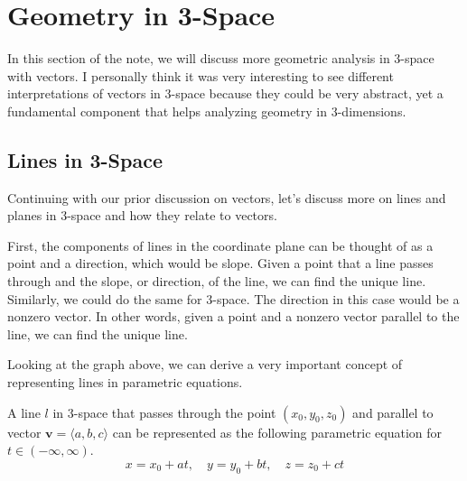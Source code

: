 \documentclass[../../main.tex]{subfiles}
\begin{document}
\section{Geometry in 3-Space}

In this section of the note, we will discuss more geometric
analysis in 3-space with vectors. I personally think it was
very interesting to see different interpretations of vectors
in 3-space because they could be very abstract, yet a fundamental
component that helps analyzing geometry in 3-dimensions.

\subsection{Lines in 3-Space}

Continuing with our prior discussion on vectors, let's discuss
more on lines and planes in 3-space and how they relate to vectors.

First, the components of lines in the coordinate plane can be thought
of as a point and a direction, which would be slope. Given a point
that a line passes through and the slope, or direction, of the line,
we can find the unique line. Similarly, we could do the same for
3-space. The direction in this case would be a nonzero vector.
In other words, given a point and a nonzero vector parallel to
the line, we can find the unique line.

\begin{figure}[H]
\centering
{}
\end{figure}

Looking at the graph above, we can derive a very important
concept of representing lines in parametric equations.

\begin{important}
A line $l$ in 3-space that passes through the point $(x_0, y_0, z_0)$
and parallel to vector $\mathbf{v} = \langle a, b, c \rangle$ can be
represented as the following parametric equation for
$t \in (-\infty, \infty)$.
\[
x = x_0 + at, \quad
y = y_0 + bt, \quad
z = z_0 + ct
\]
\end{important}
\end{document}

